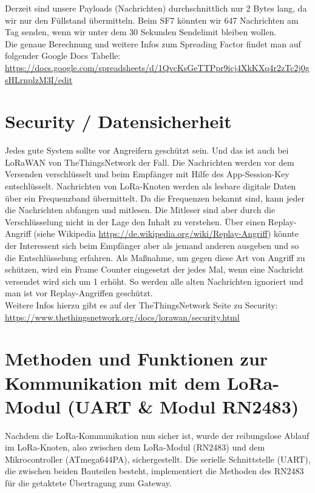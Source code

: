 \noindent
Derzeit sind unsere Payloads (Nachrichten) durchschnittlich nur 2 Bytes lang, da wir nur den Füllstand übermitteln. Beim SF7 könnten wir 647 Nachrichten am Tag senden, wenn wir unter dem 30 Sekunden Sendelimit bleiben wollen.\\

\noindent
Die genaue Berechnung und weitere Infos zum Spreading Factor findet man auf folgender Google Docs Tabelle: \url{https://docs.google.com/spreadsheets/d/1QvcKsGeTTPpr9icj4XkKXq4r2zTc2j0gsHLrnplzM3I/edit}

\section{Security / Datensicherheit}
Jedes gute System sollte vor Angreifern geschützt sein. Und das ist auch bei LoRaWAN von TheThingsNetwork der Fall. Die Nachrichten werden vor dem Versenden verschlüsselt und beim Empfänger mit Hilfe des App-Session-Key entschlüsselt. Nachrichten von LoRa-Knoten werden als lesbare digitale Daten über ein Frequenzband übermittelt. Da die Frequenzen bekannt sind, kann jeder die Nachrichten abfangen und mitlesen. Die Mitleser sind aber durch die Verschlüsselung nicht in der Lage den Inhalt zu verstehen. Über einen Replay-Angriff (siehe Wikipedia \url{https://de.wikipedia.org/wiki/Replay-Angriff}) könnte der Interessent sich beim Empfänger aber als jemand anderen ausgeben und so die Entschlüsselung erfahren. Als Maßnahme, um gegen diese Art von Angriff zu schützen, wird ein Frame Counter eingesetzt der jedes Mal, wenn eine Nachricht versendet wird sich um 1 erhöht. So werden alle alten Nachrichten ignoriert und man ist vor Replay-Angriffen geschützt.\\

\noindent
Weitere Infos hierzu gibt es auf der TheThingsNetwork Seite zu Security: \url{https://www.thethingsnetwork.org/docs/lorawan/security.html}

\section{Methoden und Funktionen zur Kommunikation mit dem LoRa-Modul (UART \& Modul RN2483)}
Nachdem die LoRa-Kommunikation nun sicher ist, wurde der reibungslose Ablauf im LoRa-Knoten, also zwischen dem LoRa-Modul (RN2483) und dem Mikrocontroller (ATmega644PA), sichergestellt.
Die serielle Schnittstelle (UART), die zwischen beiden Bauteilen besteht, implementiert die Methoden des RN2483 für die getaktete Übertragung zum Gateway.

